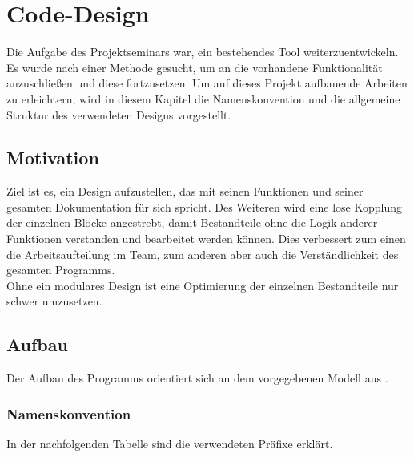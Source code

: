 \documentclass[../Report.tex]{subfiles}
\begin{document}
\chapter{Code-Design}
\label{chap:code}
Die Aufgabe des Projektseminars war, ein bestehendes Tool weiterzuentwickeln. Es wurde nach einer Methode gesucht, um an die vorhandene Funktionalität anzuschließen und diese fortzusetzen. Um auf dieses Projekt aufbauende Arbeiten zu erleichtern, wird in diesem Kapitel die Namenskonvention und die allgemeine Struktur des verwendeten Designs vorgestellt.

\section{Motivation}
\label{sec:code.motivation}
Ziel ist es, ein Design aufzustellen, das mit seinen Funktionen und seiner gesamten Dokumentation für sich spricht. Des Weiteren wird eine lose Kopplung der einzelnen Blöcke angestrebt, damit Bestandteile ohne die Logik anderer Funktionen verstanden und bearbeitet werden können. Dies verbessert zum einen die Arbeitsaufteilung im Team, zum anderen aber auch die Verständlichkeit des gesamten Programms. \\
Ohne ein modulares Design ist eine Optimierung der einzelnen Bestandteile nur schwer umzusetzen.

\section{Aufbau}
\label{sec:code.aufbau}
Der Aufbau des Programms orientiert sich an dem vorgegebenen Modell aus .

\subsection*{Namenskonvention}
\label{subsec:code.namen}
In der nachfolgenden Tabelle sind die verwendeten Präfixe erklärt.
	
\end{document}
